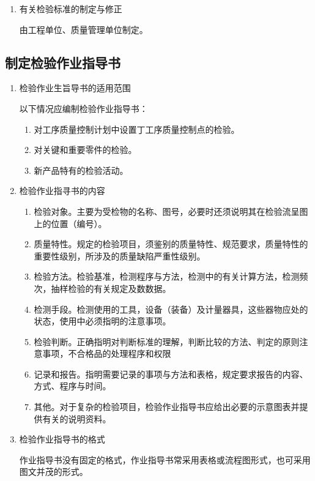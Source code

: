 \begin{enumerate}
\begin{enumerate}
            \end{enumerate}

    \item 有关检验标准的制定与修正

        由工程单位、质量管理单位制定。

    \end{enumerate}

\subsection {制定检验作业指导书}

    \begin{enumerate}
        \item 检验作业生旨导书的适用范围

        以下情况应编制检验作业指导书：

            \begin{enumerate}
                \item 对工序质量控制计划中设置丁工序质量控制点的检验。
                \item 对关键和重要零件的检验。
                \item 新产品特有的检验活动。
            \end{enumerate}
        \item 检验作业指寻书的内容

            \begin{enumerate}
                \item 检验对象。主要为受检物的名称、图号，必要时还须说明其在检验流呈图上的位置（编号）。
                \item 质量特性。规定的检验项目，须鉴别的质量特性、规范要求，质量特性的重要性级别，所涉及的质量缺陷严重性级别。
                \item 检验方法。检验基准，检测程序与方法，检测中的有关计算方法，检测频次，抽样检验的有关规定及数数据。
                \item 检测手段。检测使用的工具，设备（装备）及计量器具，这些器物应处的状态，使用中必须指明的注意事项。
                \item 检验判断。正确指明对判断标准的理解，判断比较的方法、判定的原则注意事项，不合格品的处理程序和权限
                \item 记录和报告。指明需要记录的事项与方法和表格，规定要求报告的内容、方式、程序与时间。
                \item 其他。对于复杂的检验项目，检验作业指导书应给出必要的示意图表并提供有关的说明资料。
            \end{enumerate}

        \item 检验作业指导书的格式

        作业指导书没有固定的格式，作业指导书常采用表格或流程图形式，也可采用图文并茂的形式。

    \end{enumerate}

